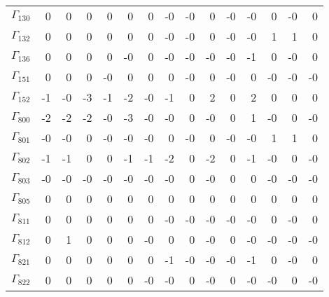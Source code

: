 {\begin{table}
\begin{center}
\else
\begin{minipage}{\linewidth}
\begin{center}
\label{tab:tau:br-fit-corr3}%
\fi
\begin{envsmall}
\begin{center}
\renewcommand*{\arraystretch}{1.1}%
\begin{tabular}{rrrrrrrrrrrrrrr}
\hline
\( \Gamma_{130} \) &    0 &    0 &    0 &    0 &    0 &    0 &   -0 &   -0 &    0 &   -0 &   -0 &    0 &   -0 &    0 \\
\( \Gamma_{132} \) &    0 &    0 &    0 &    0 &    0 &    0 &   -0 &   -0 &    0 &   -0 &   -0 &    1 &    1 &    0 \\
\( \Gamma_{136} \) &    0 &    0 &    0 &    0 &   -0 &    0 &   -0 &   -0 &   -0 &   -0 &   -1 &    0 &   -0 &    0 \\
\( \Gamma_{151} \) &    0 &    0 &    0 &   -0 &    0 &    0 &    0 &   -0 &    0 &   -0 &    0 &   -0 &   -0 &   -0 \\
\( \Gamma_{152} \) &   -1 &   -0 &   -3 &   -1 &   -2 &   -0 &   -1 &    0 &    2 &    0 &    2 &    0 &    0 &    0 \\
\( \Gamma_{800} \) &   -2 &   -2 &   -2 &   -0 &   -3 &   -0 &   -0 &    0 &   -0 &    0 &    1 &   -0 &    0 &   -0 \\
\( \Gamma_{801} \) &   -0 &   -0 &    0 &   -0 &   -0 &   -0 &    0 &   -0 &    0 &   -0 &   -0 &    1 &    1 &    0 \\
\( \Gamma_{802} \) &   -1 &   -1 &    0 &    0 &   -1 &   -1 &   -2 &    0 &   -2 &    0 &   -1 &   -0 &    0 &   -0 \\
\( \Gamma_{803} \) &   -0 &   -0 &   -0 &   -0 &   -0 &   -0 &   -0 &    0 &   -0 &    0 &    0 &   -0 &   -0 &   -0 \\
\( \Gamma_{805} \) &    0 &    0 &    0 &    0 &    0 &    0 &    0 &    0 &    0 &    0 &    0 &    0 &    0 &    0 \\
\( \Gamma_{811} \) &    0 &    0 &    0 &    0 &    0 &    0 &   -0 &   -0 &   -0 &   -0 &   -0 &    0 &   -0 &    0 \\
\( \Gamma_{812} \) &    0 &    1 &    0 &    0 &    0 &   -0 &    0 &    0 &   -0 &    0 &   -0 &   -0 &   -0 &   -0 \\
\( \Gamma_{821} \) &    0 &    0 &    0 &    0 &    0 &    0 &   -1 &   -0 &   -0 &   -0 &   -1 &    0 &   -0 &    0 \\
\( \Gamma_{822} \) &    0 &    0 &    0 &    0 &    0 &   -0 &   -0 &    0 &   -0 &    0 &   -0 &   -0 &    0 &   -0 \\

\end{tabular}
\end{center}
\end{envsmall}
\end{center}
\end{minipage}
\end{center}
\end{table}}
